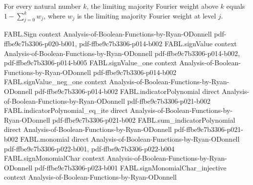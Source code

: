 \begin{theorem}
\label{FABL.limitingMajorityFourierWeightAbove_eq_one_sub_sum_range}
\leanok
{}
For every natural number $k$, the limiting majority Fourier weight above $k$ equals
$1-\sum_{j=0}^{k} w_j$, where $w_j$ is the limiting majority Fourier weight at level
$j$.
\end{theorem}

\begin{theorem}
\label{FABL.limitingMajorityFourierWeight_le_finite_level}
\leanok
{}
\proofstep
  {FABL.Sign}
  {context}
  {Analysis-of-Boolean-Functions-by-Ryan-ODonnell}
  {pdf-ffbe9c7b3306-p020-b001,
    pdf-ffbe9c7b3306-p014-b002}
\proofstep
  {FABL.signValue}
  {context}
  {Analysis-of-Boolean-Functions-by-Ryan-ODonnell}
  {pdf-ffbe9c7b3306-p014-b002,
    pdf-ffbe9c7b3306-p014-b005}
\proofstep
  {FABL.signValue_one}
  {context}
  {Analysis-of-Boolean-Functions-by-Ryan-ODonnell}
  {pdf-ffbe9c7b3306-p014-b002}
\proofstep
  {FABL.signValue_neg_one}
  {context}
  {Analysis-of-Boolean-Functions-by-Ryan-ODonnell}
  {pdf-ffbe9c7b3306-p014-b002}
\proofstep
  {FABL.indicatorPolynomial}
  {direct}
  {Analysis-of-Boolean-Functions-by-Ryan-ODonnell}
  {pdf-ffbe9c7b3306-p021-b002}
\proofstep
  {FABL.indicatorPolynomial_eq_ite}
  {direct}
  {Analysis-of-Boolean-Functions-by-Ryan-ODonnell}
  {pdf-ffbe9c7b3306-p021-b002}
\proofstep
  {FABL.sum_indicatorPolynomial}
  {direct}
  {Analysis-of-Boolean-Functions-by-Ryan-ODonnell}
  {pdf-ffbe9c7b3306-p021-b002}
\proofstep
  {FABL.monomial}
  {direct}
  {Analysis-of-Boolean-Functions-by-Ryan-ODonnell}
  {pdf-ffbe9c7b3306-p022-b001,
    pdf-ffbe9c7b3306-p022-b004}
\proofstep
  {FABL.signMonomialChar}
  {context}
  {Analysis-of-Boolean-Functions-by-Ryan-ODonnell}
  {pdf-ffbe9c7b3306-p023-b001}
\proofstep
  {FABL.signMonomialChar_injective}
  {context}
  {Analysis-of-Boolean-Functions-by-Ryan-ODonnell}

\end{theorem}
